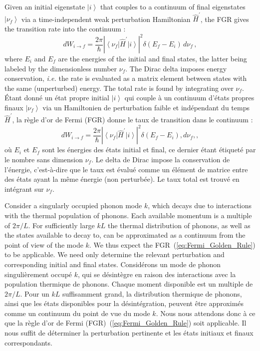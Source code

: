 \documentclass[aps,prd,notitlepage,amsfonts,amssymb,amsmath,nofootinbib,superscriptaddress,longbibliography]{revtex4-2}
\newcommand{\trad}[1]{\textcolor{tradcolor}{#1}}
\begin{document}
Given an initial eigenstate $\left|i\right\rangle$ that couples to a continuum of final eigenstates $\left|\nu_f\right\rangle$ via a time-independent weak perturbation Hamiltonian $\hat{H}^{\prime}$, the FGR gives the transition rate into the continuum
\cite{CohenTannoudji2020}:
\begin{equation}
\label{eq:Fermi_Golden_Rule}
   dW_{i \to f} = \frac{2\pi}{\hbar} \left| \left\langle \nu_f \right| \hat{H}^{\prime} \left| i \right\rangle \right|^{2} \delta\left(E_{f}-E_{i}\right) \, d\nu_{f} \,,
\end{equation}
where $E_{i}$ and $E_{f}$ are the energies of the initial and final states, the latter being labeled by the dimensionless number $\nu_{f}$.  The Dirac delta imposes energy conservation, {\it i.e.} the rate is evaluated as a matrix element between states with the same (unperturbed) energy. The total rate is found by integrating over $\nu_{f}$.
\trad{
Étant donné un état propre initial $\left|i\right\rangle$ qui couple à un continuum d'états propres finaux $\left|\nu_f\right\rangle$ via un Hamiltonien de perturbation faible et indépendant du temps $\hat{H}^{\prime}$, la règle d'or de Fermi (FGR) donne le taux de transition dans le continuum \cite{CohenTannoudji2020} :
\begin{equation*}
dW_{i \to f} = \frac{2\pi}{\hbar} \left| \left\langle \nu_f \right| \hat{H}^{\prime} \left| i \right\rangle \right|^{2} \delta\left(E_{f}-E_{i}\right) , d\nu_{f} ,,
\end{equation*}
où $E_{i}$ et $E_{f}$ sont les énergies des états initial et final, ce dernier étant étiqueté par le nombre sans dimension $\nu_{f}$. Le delta de Dirac impose la conservation de l'énergie, c'est-à-dire que le taux est évalué comme un élément de matrice entre des états ayant la même énergie (non perturbée). Le taux total est trouvé en intégrant sur $\nu_{f}$.
}


Consider a singularly occupied phonon mode $k$, which decays due to interactions with the thermal population of phonons.  Each available momentum is a multiple of $2\pi/L$. For sufficiently large $k L$ the thermal distribution of phonons, as well as the states available to decay to, can be approximated as a continuum from the point of view of the mode $k$. We thus expect the FGR~(\ref{eq:Fermi_Golden_Rule}) to be applicable.  We need only determine the relevant perturbation and corresponding initial and final states.
\trad{
Considérons un mode de phonon singulièrement occupé $k$, qui se désintègre en raison des interactions avec la population thermique de phonons. Chaque moment disponible est un multiple de $2\pi/L$. Pour un $k L$ suffisamment grand, la distribution thermique de phonons, ainsi que les états disponibles pour la désintégration, peuvent être approximés comme un continuum du point de vue du mode $k$. Nous nous attendons donc à ce que la règle d'or de Fermi (FGR)~(\ref{eq:Fermi_Golden_Rule}) soit applicable. Il nous suffit de déterminer la perturbation pertinente et les états initiaux et finaux correspondants.
}
\end{document}

